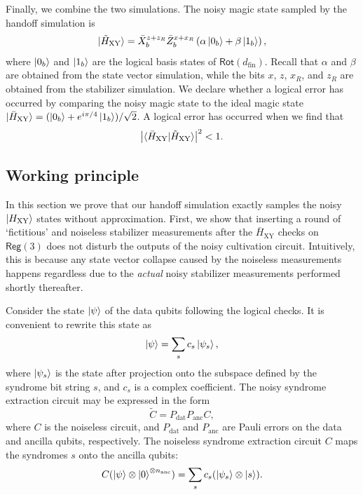 \documentclass[%
    aps, 
    physrev,
    reprint,
]{revtex4-2}
\newcommand{\rot}[1]{\mathsf{Rot}(#1)}
\newcommand{\reg}[1]{\mathsf{Reg}(#1)}
\newcommand{\XY}{_\mathrm{XY}}
\newcommand{\fin}{_\mathrm{fin}}
\newcommand{\dat}{_\mathrm{dat}}
\newcommand{\anc}{_\mathrm{anc}}
\begin{document}
Finally, we combine the two simulations.
The noisy magic state sampled by the handoff simulation is
\begin{align}
    \ket{\tilde{H}\XY} 
    = 
    \bar{X}\B^{z+z_R} \bar{Z}\B^{x+x_R}\left(\alpha\ket{0\B} + \beta\ket{1\B}\right)
    , 
    \label{eq:H_XY-sample}
\end{align}
where $\ket{0_b}$ and $\ket{1_b}$ are the logical basis states of $\rot{d\fin}$.
Recall that $\alpha$ and $\beta$ are obtained from the state vector simulation, while the bits $x$, $z$, $x_R$, and $z_R$ are obtained from the stabilizer simulation.
We declare whether a logical error has occurred by comparing the noisy magic state to the ideal magic state
$ \ket{\bar{H}\XY} = (\ket{0\B} + e^{i\pi/4}\ket{1\B})/\sqrt{2}$.
A logical error has occurred when we find that
\begin{equation}
    \big|\! \braket{\bar{H}\XY|\tilde{H}\XY} \!\big|^2 < 1.
\end{equation}


\subsection{Working principle}\label{sec:handoff-proof}

In this section we prove that our handoff simulation exactly samples the noisy $\ket{H\XY}$ states without approximation.
First, we show that inserting a round of `fictitious' and noiseless stabilizer measurements after the $\bar{H}\XY$ checks on $\reg3$
does not disturb the outputs of the noisy cultivation circuit. 
Intuitively, this is because any state vector collapse caused by the noiseless measurements happens regardless due to the \textit{actual} noisy stabilizer measurements performed shortly thereafter.

Consider the state $\ket{\psi}$ of the data qubits following the logical checks.
It is convenient to rewrite this state as
\begin{equation}
    {\ket{\psi} = \sum_s c_s \ket{\psi_s},}
\end{equation}
where $\ket{\psi_s}$ is the state after projection onto the subspace defined by the syndrome bit string $s$, and $c_s$ is a complex coefficient.
The noisy syndrome extraction circuit may be expressed in the form
\begin{equation}
    \tilde{C} = P\dat P\anc C,
\end{equation}
where $C$ is the noiseless circuit, and $P\dat$ and $P\anc$ are Pauli errors on the data and ancilla qubits, respectively.
The noiseless syndrome extraction circuit $C$ maps the syndromes $s$ onto the ancilla qubits:
\begin{equation}\label{eq:stab-msmt}
    {C (\ket{\psi} \otimes \ket{0}^{\otimes n\anc})
    =
    \sum_s c_s (\ket{\psi_s} \otimes \ket{s})
    .}
\end{equation}
\end{document}
